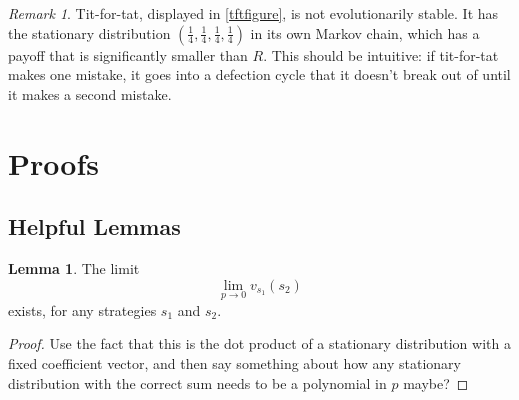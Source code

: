 \documentclass[11pt]{amsart}
\theoremstyle{definition}
\newtheorem{lemma}{Lemma}
\theoremstyle{remark}
\newtheorem*{remark}{Remark}
\begin{document}
\begin{remark}
  Tit-for-tat, displayed in \cref{tftfigure}, is not evolutionarily stable. It has the stationary distribution $(\frac{1}{4},\frac{1}{4},\frac{1}{4},\frac{1}{4})$ in its own Markov chain, which has a payoff that is significantly smaller than $R$. This should be intuitive: if tit-for-tat makes one mistake, it goes into a defection cycle that it doesn't break out of until it makes a second mistake.

\end{remark}


\section{Proofs}

\subsection{Helpful Lemmas}

\begin{lemma}
  \label{limitvexists}
  The limit \begin{equation*}
    \lim_{p \to 0} v_{s_1}(s_2)
  \end{equation*}
  exists, for any strategies $s_1$ and $s_2$.
\end{lemma}
\begin{proof}
  Use the fact that this is the dot product of a stationary distribution with a fixed coefficient vector, and then say something about how any stationary distribution with the correct sum needs to be a polynomial in $p$ maybe?
\end{proof}
\end{document}
